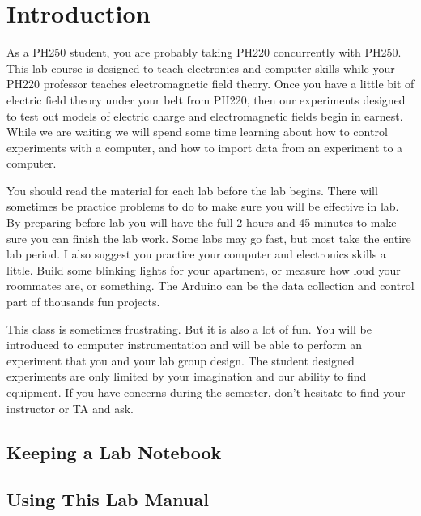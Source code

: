 
\chapter{Introduction}
As a PH250 student, you are probably taking PH220 concurrently with PH250. This lab course is designed to teach electronics and computer skills while your PH220 professor teaches electromagnetic field theory. Once you have a little bit of electric field theory under your belt from PH220, then our experiments designed to test out models of electric charge and electromagnetic fields begin in earnest. While we are waiting we will spend some time learning about how to control experiments with a computer, and how to import data from an experiment to a computer.

You should read the material for each lab before the lab begins. There will sometimes be practice problems to do to make sure you will be effective in lab. By preparing before lab you will have the full 2 hours and 45 minutes to make sure you can finish the lab work. Some labs may go fast, but most take the entire lab period. I also suggest you practice your computer and electronics skills a little. Build some blinking lights for your apartment, or measure how loud your roommates are, or something. The Arduino can be the data collection and control part of thousands fun projects.

This class is sometimes frustrating. But it is also a lot of fun. You will be introduced to computer instrumentation and will be able to perform an experiment that you and your lab group design. The student designed experiments are only limited by your imagination and our ability to find equipment. If you have concerns during the semester, don't hesitate to find your instructor or TA and ask.

\section*{Keeping a Lab Notebook}


\section*{Using This Lab Manual}

